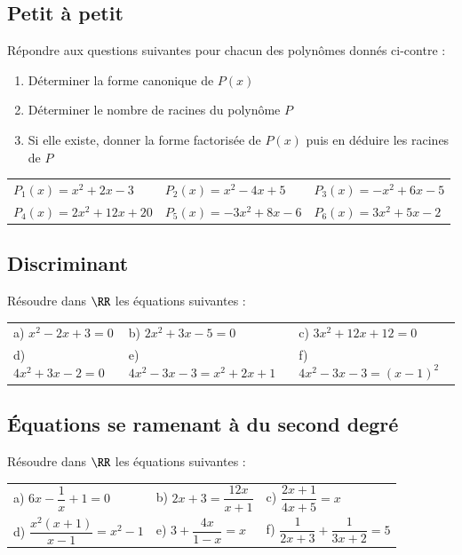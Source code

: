 \documentclass[oneside,12pt]{article}          %
\begin{document}
\subsection{Petit à petit}
Répondre aux questions suivantes pour chacun des polynômes donnés ci-contre :
\begin{enumerate}
	\item Déterminer la forme canonique de $P(x)$
	\item Déterminer le nombre de racines du polynôme $P$
	\item Si elle existe, donner la forme factorisée de $P(x)$ puis en déduire les racines de $P$
\end{enumerate}

\begin{tabular}{p{} p{} p{} }
    $P_1(x)= x^2+2x-3$ & $P_2(x)=x^2-4x+5$ & $P_3(x)=-x^2+6x-5$ \\
    $P_4(x)= 2x^2+12x+20$ & $P_5(x)= -3x^2+8x-6$ & $P_6(x)= 3x^2+5x-2$
\end{tabular}



\subsection{Discriminant}
Résoudre dans $\RR$ les équations suivantes :

\begin{tabular}{p{} p{} p{} }
    a) $x^2-2x+3=0$ & b) $2x^2+3x-5=0$ & c) $3x^2+12x+12=0$ \\
    d) $4x^2+3x-2=0$ & e) $4x^2-3x-3=x^2+2x+1$ & f) $4x^2-3x-3=(x-1)^2$
\end{tabular}



\subsection{Équations se ramenant à du second degré}
Résoudre dans $\RR$ les équations suivantes :

\renewcommand{\arraystretch}{2.4}
\begin{tabular}{p{} p{} p{} }
    a) $6x -\dfrac{1}{x} + 1 = 0 $ & b) $2x+3=\dfrac{12x}{x+1}$ & c) $\dfrac{2x+1}{4x+5}= x$ \\
    d) $\dfrac{x^{2}(x+1)}{x-1}= x^{2}-1$ & e) $3+\dfrac{4x}{1-x}=x$ & f) $\dfrac{1}{2x+3}+ \dfrac{1}{3x+2}=5$ 
\end{tabular}
\end{document}
